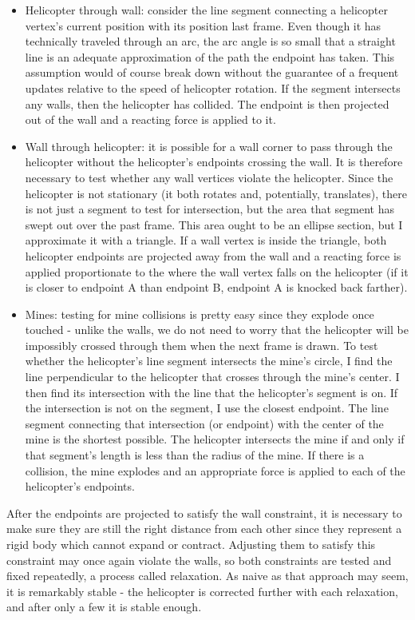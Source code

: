 \documentclass [12pt]{article}
\begin{document}
\begin{itemize}
	\item Helicopter through wall: consider the line segment connecting a helicopter vertex's current position with its position last frame. Even though it has technically traveled through an arc, the arc angle is so small that a straight line is an adequate approximation of the path the endpoint has taken. This assumption would of course break down without the guarantee of a frequent updates relative to the speed of helicopter rotation. If the segment intersects any walls, then the helicopter has collided. The endpoint is then projected out of the wall and a reacting force is applied to it.
	\item Wall through helicopter: it is possible for a wall corner to pass through the helicopter without the helicopter's endpoints crossing the wall. It is therefore necessary to test whether any wall vertices violate the helicopter. Since the helicopter is not stationary (it both rotates and, potentially, translates), there is not just a segment to test for intersection, but the area that segment has swept out over the past frame. This area ought to be an ellipse section, but I approximate it with a triangle. If a wall vertex is inside the triangle, both helicopter endpoints are projected away from the wall and a reacting force is applied proportionate to the where the wall vertex falls on the helicopter (if it is closer to endpoint A than endpoint B, endpoint A is knocked back farther).
	\item Mines: testing for mine collisions is pretty easy since they explode once touched - unlike the walls, we do not need to worry that the helicopter will be impossibly crossed through them when the next frame is drawn. To test whether the helicopter's line segment intersects the mine's circle, I find the line perpendicular to the helicopter that crosses through the mine's center. I then find its intersection with the line that the helicopter's segment is on. If the intersection is not on the segment, I use the closest endpoint. The line segment connecting that intersection (or endpoint) with the center of the mine is the shortest possible. The helicopter intersects the mine if and only if that segment's length is less than the radius of the mine. If there is a collision, the mine explodes and an appropriate force is applied to each of the helicopter's endpoints.
\end{itemize}

After the endpoints are projected to satisfy the wall constraint, it is necessary to make sure they are still the right distance from each other since they represent a rigid body which cannot expand or contract. Adjusting them to satisfy this constraint may once again violate the walls, so both constraints are tested and fixed repeatedly, a process called relaxation. As naive as that approach may seem, it is remarkably stable - the helicopter is corrected further with each relaxation, and after only a few it is stable enough.
\end{document}
